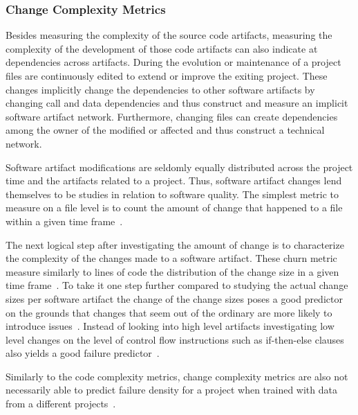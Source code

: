 \subsubsection{Change Complexity Metrics}
Besides measuring the complexity of the source code artifacts, measuring the complexity of the development of those code artifacts can also indicate at dependencies across artifacts.
During the evolution or maintenance of a project files are continuously edited to extend or improve the exiting project.
These changes implicitly change the dependencies to other software artifacts by changing call and data dependencies and thus construct and measure an implicit software artifact network.
Furthermore, changing files can create dependencies among the owner of the modified or affected and thus construct a technical network.

Software artifact modifications are seldomly equally distributed across the project time and the artifacts related to a project.
Thus, software artifact changes lend themselves to be studies in relation to software quality.
The simplest metric to measure on a file level is to count the amount of change that happened to a file within a given time frame~\cite{li:metrics:2005,moser:icse:2008,cataldo:icse:2011}.

The next logical step after investigating the amount of change is to characterize the complexity of the changes made to a software artifact. 
These churn metric measure similarly to lines of code the distribution of the change size in a given time frame~\cite{nagappan:icse:2005,shihab:fse:2011,zimmermann:fse:2009,bell:promise:2011}.
To take it one step further compared to studying the actual change sizes per software artifact the change of the change sizes poses a good predictor on the grounds that changes that seem out of the ordinary are more likely to introduce issues~\cite{hassan:icse:2009}.
Instead of looking into high level artifacts investigating low level changes on the level of control flow instructions such as if-then-else clauses also yields a good failure predictor~\cite{giger:msr:2011}.

Similarly to the code complexity metrics, change complexity metrics are also not necessarily able to predict failure density for a project when trained with data from a different projects~\cite{zimmermann:fse:2009}.


